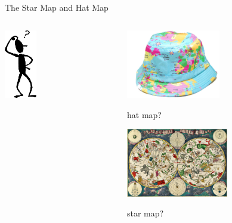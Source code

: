 \begin{frame}[fragile,label=P5Lemma]{The Star Map and Hat Map}
  \begin{columns}
    \begin{column}{0.3\textwidth}
      \hskip1cm \includegraphics[height=3cm]{inputs/amconfus.png}
    \end{column}
    \begin{column}{0.7\textwidth}
      \includegraphics[height=3cm]{inputs/maphat.jpg}
      \begin{center}hat map?\end{center}
      \vskip1cm
      \includegraphics[height=3cm]{inputs/starchart}
      \begin{center}star map?\end{center}
    \end{column}
  \end{columns}
\end{frame}


